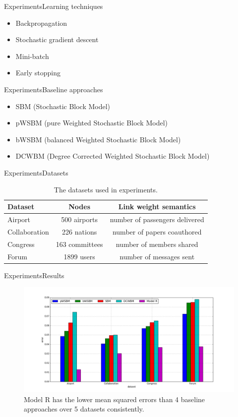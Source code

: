 \documentclass{beamer}
\begin{document}
\begin{frame}{Experiments}{Learning techniques}
	\begin{itemize}
		\item Backpropagation
		\item Stochastic gradient descent
		\item Mini-batch
		\item Early stopping
	\end{itemize}	
\end{frame}

\begin{frame}{Experiments}{Baseline approaches}
	\begin{itemize}
		\item SBM (Stochastic Block Model)
		\item pWSBM (pure Weighted Stochastic Block Model)
		\item bWSBM (balanced Weighted Stochastic Block Model)
		\item DCWBM (Degree Corrected Weighted Stochastic Block Model)
	\end{itemize}
\end{frame}

\begin{frame}{Experiments}{Datasets}
	\begin{table}[H]\centering
		\caption{The datasets used in experiments.}
		\begin{tabularx}{\textwidth}{|X|c|c|}  \hline
			Dataset & Nodes & Link weight semantics \\ \hline
			Airport & 500 airports & number of passengers delivered \\ \hline
			Collaboration & 226 nations & number of papers coauthored \\ \hline
			Congress & 163 committees  & number of members shared \\ \hline
			Forum  & 1899 users & number of messages sent \\ \hline
		\end{tabularx}
		\label{tab:datasets}
	\end{table}
\end{frame}

\begin{frame}{Experiments}{Results}
	\begin{figure}[H]\centering
		\includegraphics[width=\textwidth]{link-weight-errors}
		\caption{
			Model R has the lower mean squared errors than 4 baseline approaches over 5 datasets consistently.
		}
		\label{fig:errors}
	\end{figure}
\end{frame}
\end{document}
